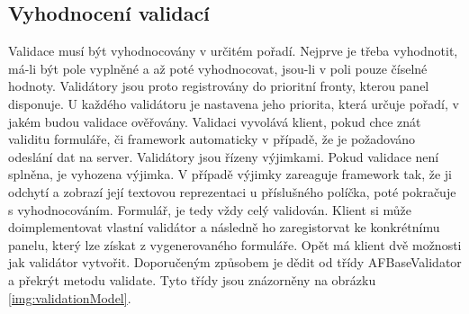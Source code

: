 \subsection{Vyhodnocení validací}
Validace musí být vyhodnocovány v určitém pořadí. Nejprve je třeba vyhodnotit, má-li být pole vyplněné a až poté vyhodnocovat, jsou-li v poli pouze číselné hodnoty. Validátory jsou proto registrovány do prioritní fronty, kterou panel disponuje. U každého validátoru je nastavena jeho priorita, která určuje pořadí, v jakém budou validace ověřovány. Validaci vyvolává klient, pokud chce znát validitu formuláře, či framework automaticky v případě, že je požadováno odeslání dat na server. Validátory jsou řízeny výjimkami. Pokud validace není splněna, je vyhozena výjimka. V případě výjimky zareaguje framework tak, že ji odchytí a zobrazí její textovou reprezentaci u příslušného políčka, poté pokračuje s vyhodnocováním. Formulář, je tedy vždy celý validován. Klient si může doimplementovat vlastní validátor a následně ho zaregistorvat ke konkrétnímu panelu, který lze získat z vygenerovaného formuláře. Opět má klient dvě možnosti jak validátor vytvořit. Doporučeným způsobem je dědit od třídy AFBaseValidator a překrýt metodu validate. Tyto třídy jsou znázorněny na obrázku \ref{img:validationModel}.

